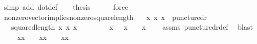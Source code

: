 \begin{isabellebody}
\ {\isacharparenleft}{\kern0pt}simp\ add{\isacharcolon}{\kern0pt}\ dot{\isacharunderscore}{\kern0pt}def{\isacharparenright}{\kern0pt}\isanewline
\ \ \isamarkupfalse%
\ {\isacharquery}{\kern0pt}thesis\ \isamarkupfalse%
\ {}\ {}\ \isamarkupfalse%
\ force\isanewline
{}\isamarkupfalse%
%
\endisatagproof
{\isafoldproof}%
%
\isadelimproof
\isanewline
%
\endisadelimproof
\isanewline
{}\isamarkupfalse%
\ nonzero{\isacharunderscore}{\kern0pt}vector{\isacharunderscore}{\kern0pt}implies{\isacharunderscore}{\kern0pt}nonzero{\isacharunderscore}{\kern0pt}square{\isacharunderscore}{\kern0pt}length{\isacharcolon}{\kern0pt}\isanewline
\ \ \ {\isachardoublequoteopen}{\isacharparenleft}{\kern0pt}x{}{\isacharcomma}{\kern0pt}\ x{}{\isacharcomma}{\kern0pt}\ x{}{\isacharparenright}{\kern0pt}\ {\isasymin}\ punctured{\isacharunderscore}{\kern0pt}r{\isacharunderscore}{\kern0pt}{}{\isachardoublequoteclose}\isanewline
\ \ \ {\isachardoublequoteopen}squared{\isacharunderscore}{\kern0pt}length\ {\isacharparenleft}{\kern0pt}x{}{\isacharcomma}{\kern0pt}\ x{}{\isacharcomma}{\kern0pt}\ x{}{\isacharparenright}{\kern0pt}\ {\isachargreater}{\kern0pt}\ {}{\isachardoublequoteclose}\isanewline
%
\isadelimproof
%
\endisadelimproof
%
\isatagproof
{}\isamarkupfalse%
\ {\isacharminus}{\kern0pt}\isanewline
\ \ \isamarkupfalse%
\ {}{\isacharcolon}{\kern0pt}\ {\isachardoublequoteopen}x{}\ {\isasymnoteq}\ {}{\isasymor}\ x{}\ {\isasymnoteq}\ {}\ {\isasymor}\ x{}\ {\isasymnoteq}\ {}{\isachardoublequoteclose}\ \isamarkupfalse%
\ assms\ punctured{\isacharunderscore}{\kern0pt}r{\isacharunderscore}{\kern0pt}{}{\isacharunderscore}{\kern0pt}def\ \isamarkupfalse%
\ blast\isanewline
\ \ \isamarkupfalse%
\ {}{\isacharcolon}{\kern0pt}\ {\isachardoublequoteopen}x{}{\isacharasterisk}{\kern0pt}x{}\ {\isachargreater}{\kern0pt}\ {}\ {\isasymor}\ x{}{\isacharasterisk}{\kern0pt}x{}\ {\isachargreater}{\kern0pt}\ {}\ {\isasymor}\ x{}{\isacharasterisk}{\kern0pt}x{}\ {\isachargreater}{\kern0pt}\ {}{\isachardoublequoteclose}\ \isamarkupfalse%

\end{isabellebody}
